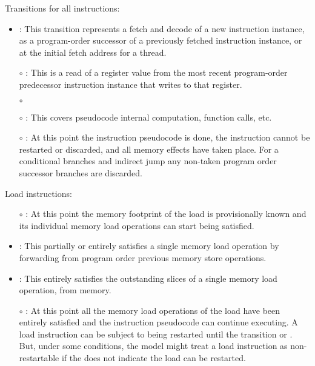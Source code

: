 \noindent Transitions for all instructions:
\begin{itemize}
\item {}: This transition represents a fetch and decode of a new instruction instance, as a program-order successor of a previously fetched instruction instance, or at the initial fetch address for a thread.
\item[$\circ$] : This is a read of a register value from the most recent program-order predecessor instruction instance that writes to that register.
\item[$\circ$] 
\item[$\circ$] : This covers pseudocode internal computation, function calls, etc.
\item[$\circ$] : At this point the instruction pseudocode is done, the instruction cannot be restarted or discarded, and all memory effects have taken place. For a conditional branches and indirect jump any non-taken program order successor branches are discarded.
\end{itemize}

\noindent Load instructions:
\begin{itemize}
\item[$\circ$] : At this point the memory footprint of the load is provisionally known and its individual memory load operations can start being satisfied.
\item {}: This partially or entirely satisfies a single memory load operation by forwarding from program order previous memory store operations.
\item {}: This entirely satisfies the outstanding slices of a single memory load operation, from memory.
\item[$\circ$] : At this point all the memory load operations of the load have been entirely satisfied and the instruction pseudocode can continue executing.
A load instruction can be subject to being restarted until the  transition or .
But, under some conditions, the model might treat a load instruction as non-restartable if the  does not indicate the load can be restarted.
\end{itemize}

